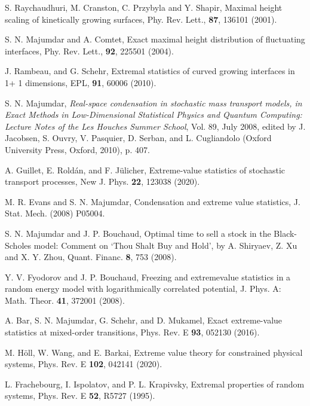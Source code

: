 \documentclass[showpacs,amsmath,amssymb,aps,pre,twocolumn,]{revtex4-1}
\begin{document}
\begin{thebibliography}{}

S. Raychaudhuri, M. Cranston, C. Przybyla and Y. Shapir, Maximal height scaling of kinetically growing surfaces, Phy. Rev. Lett., \textbf{87}, 136101 (2001).

S. N. Majumdar and A. Comtet, Exact maximal height distribution of fluctuating interfaces, Phy. Rev. Lett., \textbf{92}, 225501 (2004).


J. Rambeau, and G. Schehr, Extremal statistics of curved growing interfaces in 1+ 1 dimensions, EPL, \textbf{91}, 60006 (2010).


S. N. Majumdar, \textit{Real-space condensation in stochastic mass transport models, in Exact Methods in Low-Dimensional Statistical Physics and Quantum Computing: Lecture Notes of the Les Houches Summer School}, Vol. 89, July 2008, edited by J. Jacobsen, S. Ouvry, V. Pasquier, D. Serban, and L. Cugliandolo (Oxford University Press, Oxford, 2010), p. 407.

 A. Guillet, E. Rold\'{a}n, and F. J\"{u}licher, Extreme-value statistics of stochastic transport processes, New J. Phys. \textbf{22}, 123038 (2020).

M. R. Evans and S. N. Majumdar, Condensation and extreme value statistics, J. Stat. Mech. (2008) P05004.

S. N. Majumdar and J. P. Bouchaud, Optimal time to sell a stock in the Black-Scholes model: Comment on `Thou Shalt Buy and Hold’, by A. Shiryaev, Z. Xu and X. Y. Zhou, Quant. Financ. \textbf{8}, 753 (2008).


Y. V. Fyodorov and J. P. Bouchaud, Freezing and extremevalue statistics in a random energy model with logarithmically
correlated potential, J. Phys. A: Math. Theor. \textbf{41}, 372001 (2008).



 A. Bar, S. N. Majumdar, G. Schehr, and D. Mukamel, Exact extreme-value statistics at mixed-order transitions, Phys. Rev. E \textbf{93}, 052130 (2016).


M. H\"{o}ll, W. Wang, and E. Barkai, Extreme value theory for constrained physical systems, Phys. Rev. E \textbf{102}, 042141
(2020).



 L. Frachebourg, I. Ispolatov, and P. L. Krapivsky, Extremal properties of random systems, Phys. Rev. E \textbf{52}, R5727
(1995).


\end{thebibliography}
\end{document}
